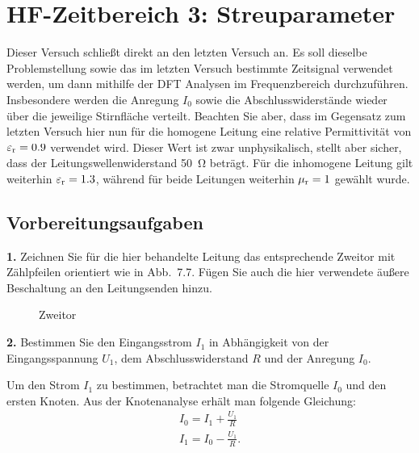 \documentclass[Protokollheft.tex]{subfiles}
\begin{document}
\chapter{HF-Zeitbereich 3: Streuparameter}
Dieser Versuch schließt direkt an den letzten Versuch an. Es soll dieselbe
Problemstellung sowie das im letzten Versuch bestimmte Zeitsignal verwendet werden,
um dann mithilfe der DFT Analysen im Frequenzbereich durchzuführen. Insbesondere 
werden die Anregung $I_0$ sowie die Abschlusswiderstände wieder über die jeweilige 
Stirnfläche verteilt. Beachten Sie aber, dass im Gegensatz zum letzten Versuch hier nun
für die homogene Leitung eine relative Permittivität von $\varepsilon_{\text{r}}=0.9$ verwendet wird.
Dieser Wert ist zwar unphysikalisch, stellt aber sicher, dass der 
Leitungswellenwiderstand \SI{50}{\ohm} beträgt. Für die inhomogene Leitung gilt weiterhin
$\varepsilon_{\text{r}}=1.3$, während für beide Leitungen weiterhin $\mu_{\text{r}}=1$ gewählt wurde.

\section{Vorbereitungsaufgaben}

\begin{framed}
	\noindent \textbf{1.} Zeichnen Sie für die hier behandelte Leitung das entsprechende Zweitor mit Zählpfeilen orientiert wie in Abb.~7.7. Fügen Sie auch die hier verwendete äußere Beschaltung an den Leitungsenden hinzu.\label{exer:twoPort}
\end{framed}

\begin{figure}[h]
	\centering
	\def\svgwidth{0.8\textwidth}
	
	\caption{Zweitor}
	\label{fig:schal}
\end{figure}
\begin{framed}
	\noindent \textbf{2.} Bestimmen Sie den Eingangsstrom $I_1$ in Abhängigkeit von der Eingangsspannung $U_1$, dem Abschlusswiderstand $R$ und der Anregung $I_0$.\label{exer:calcI1}
\end{framed}

Um den Strom $I_1$ zu bestimmen, betrachtet man die Stromquelle $I_0$ und den ersten Knoten. Aus der Knotenanalyse erhält man folgende Gleichung: 
\begin{eqnarray}
I_0  = I_1 + \frac{U_1}{R} \\
I_1 = I_0-\frac{U_1}{R}.
\end{eqnarray}
 
\end{document}
